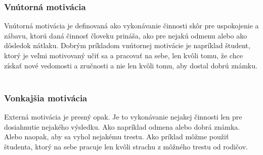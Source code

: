 \documentclass[10pt,oneside,slovak,a4paper]{article}
\begin{document}
\subsubsection{Vnútorná motivácia} \label{vnutorna}
Vnútorná motivácia je definovaná ako vykonávanie činnosti skôr pre uspokojenie a zábavu, ktorú daná činnosť človeku prináša, ako pre nejakú odmenu alebo ako dôsledok nátlaku. Dobrým príkladom vnútornej motivácie je napríklad študent, ktorý je veľmi motivovaný učiť sa a pracovať na sebe, len kvôli tomu, že chce získať nové vedomosti a zručnosti a nie len kvôli tomu, aby dostal dobrú známku. ~\cite{ryan2000intrinsic}

\subsubsection{Vonkajšia motivácia} \label{vonkajsia}
Externá motivácia je presný opak. Je to vykonávanie nejakej činnosti len pre dosiahnutie nejakého výsledku. Ako napríklad odmena alebo dobrá známka. Alebo naopak, aby sa vyhol nejakému trestu. Ako príklad môžme použiť študenta, ktorý na sebe pracuje len kvôli strachu z môžného trestu od rodičov. ~\cite{ryan2000intrinsic}








\end{document}
